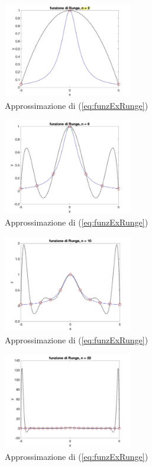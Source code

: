 \begin{figure}
    \centering
    \includegraphics[width=0.5\textwidth]{immagini/funzioneRunge_n=2.jpg}
    \caption{Approssimazione di (\ref{eq:funzExRunge})}\label{fig:funzRunge_n=2}
\end{figure}
\begin{figure}
    \centering
    \includegraphics[width=0.5\textwidth]{immagini/funzioneRunge_n=6.jpg}
    \caption{Approssimazione di (\ref{eq:funzExRunge})}\label{fig:funzRunge_n=6}
\end{figure}
\begin{figure}
    \centering
    \includegraphics[width=0.5\textwidth]{immagini/funzioneRunge_n=10.jpg}
    \caption{Approssimazione di (\ref{eq:funzExRunge})}\label{fig:funzRunge_n=10}
\end{figure}
\begin{figure}
    \centering
    \includegraphics[width=0.5\textwidth]{immagini/funzioneRunge_n=22.jpg}
    \caption{Approssimazione di (\ref{eq:funzExRunge})}\label{fig:funzRunge_n=22}
\end{figure}

